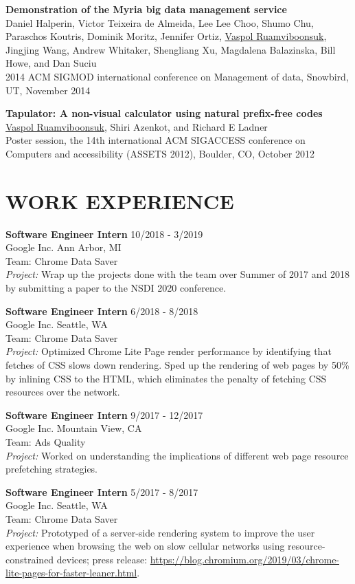 \documentclass[zhemargin]{res}
\begin{document}
\begin{resume}
    \textbf{Demonstration of the Myria big data management service}\\
    Daniel Halperin, Victor Teixeira de Almeida, Lee Lee Choo, Shumo Chu, Paraschos Koutris,
    Dominik Moritz, Jennifer Ortiz, \underline{Vaspol Ruamviboonsuk}, Jingjing Wang,
    Andrew Whitaker, Shengliang Xu, Magdalena Balazinska, Bill Howe, and Dan Suciu\\
    2014 ACM SIGMOD international conference on Management of data, Snowbird, UT, November 2014

    \textbf{Tapulator: A non-visual calculator using natural prefix-free codes}\\
    \underline{Vaspol Ruamviboonsuk}, Shiri Azenkot, and Richard E Ladner\\
    Poster session, the 14th international ACM SIGACCESS conference on Computers and accessibility (ASSETS 2012), Boulder, CO, October 2012

\section{\small WORK EXPERIENCE}
    \textbf{Software Engineer Intern} \hfill 10/2018 - 3/2019 \\
    Google Inc. Ann Arbor, MI\\
    Team: Chrome Data Saver \\
    \emph{Project:} Wrap up the projects done with the team over Summer of 2017
    and 2018 by submitting a paper to the NSDI 2020 conference.

    \textbf{Software Engineer Intern} \hfill 6/2018 - 8/2018 \\
    Google Inc. Seattle, WA\\
    Team: Chrome Data Saver \\
    \emph{Project:} Optimized Chrome Lite Page render performance by
    identifying that fetches of CSS slows down rendering.
    Sped up the rendering of web pages by 50\% by inlining CSS to the HTML,
    which eliminates the penalty of fetching CSS resources over the network.

    \textbf{Software Engineer Intern} \hfill 9/2017 - 12/2017 \\
    Google Inc. Mountain View, CA\\
    Team: Ads Quality \\
    \emph{Project:} Worked on understanding the implications of different web page resource prefetching strategies.

    \textbf{Software Engineer Intern} \hfill 5/2017 - 8/2017 \\
    Google Inc. Seattle, WA\\
    Team: Chrome Data Saver \\
    \emph{Project:} Prototyped of a server-side rendering system to improve the
    user experience when browsing the web on slow cellular networks using
    resource-constrained devices; press release:
    \url{https://blog.chromium.org/2019/03/chrome-lite-pages-for-faster-leaner.html}.


\end{resume}
\end{document}
